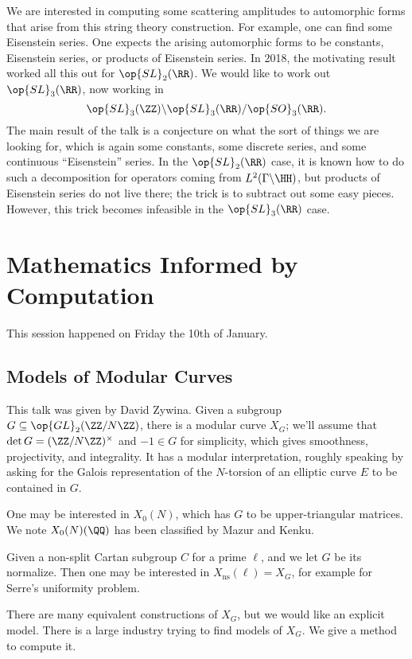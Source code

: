\documentclass{article}
\begin{document}
We are interested in computing some scattering amplitudes to automorphic forms that arise from this string theory construction. For example, one can find some Eisenstein series. One expects the arising automorphic forms to be constants, Eisenstein series, or products of Eisenstein series. In 2018, the motivating result worked all this out for $\op{SL}_2(\RR)$. We would like to work out $\op{SL}_3(\RR)$, now working in
\[\op{SL}_3(\ZZ)\backslash\op{SL}_3(\RR)/\op{SO}_3(\RR).\]
The main result of the talk is a conjecture on what the sort of things we are looking for, which is again some constants, some discrete series, and some continuous ``Eisenstein'' series. In the $\op{SL}_2(\RR)$ case, it is known how to do such a decomposition for operators coming from $L^2(\Gamma\backslash\HH)$, but products of Eisenstein series do not live there; the trick is to subtract out some easy pieces. However, this trick becomes infeasible in the $\op{SL}_3(\RR)$ case.

\section{Mathematics Informed by Computation}
This session happened on Friday the 10th of January.

\subsection{Models of Modular Curves}
This talk was given by David Zywina. Given a subgroup $G\subseteq\op{GL}_2(\ZZ/N\ZZ)$, there is a modular curve $X_G$; we'll assume that $\det G=(\ZZ/N\ZZ)^\times$ and $-1\in G$ for simplicity, which gives smoothness, projectivity, and integrality. It has a modular interpretation, roughly speaking by asking for the Galois representation of the $N$-torsion of an elliptic curve $E$ to be contained in $G$.
\begin{example}
	One may be interested in $X_0(N)$, which has $G$ to be upper-triangular matrices. We  note $X_0(N)(\QQ)$ has been classified by Mazur and Kenku.
\end{example}
\begin{example}
	Given a non-split Cartan subgroup $C$ for a prime $\ell$, and we let $G$ be its normalize. Then one may be interested in $X_{\mathrm{ns}}(\ell)=X_G$, for example for Serre's uniformity problem.
\end{example}
There are many equivalent constructions of $X_G$, but we would like an explicit model. There is a large industry trying to find models of $X_G$. We give a method to compute it.
\end{document}
